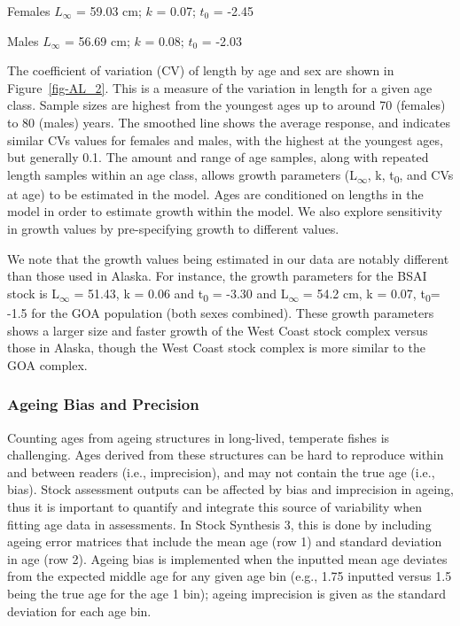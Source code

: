 \documentclass[
]{scrartcl}
\begin{document}
\begin{centering}

Females $L_{\infty}$ = 59.03 cm; $k$ = 0.07; $t_0$ = -2.45

Males $L_{\infty}$ = 56.69 cm; $k$ = 0.08; $t_0$ = -2.03

\end{centering}

The coefficient of variation (CV) of length by age and sex are shown in
Figure~\ref{fig-AL_2}. This is a measure of the variation in length for
a given age class. Sample sizes are highest from the youngest ages up to
around 70 (females) to 80 (males) years. The smoothed line shows the
average response, and indicates similar CVs values for females and
males, with the highest at the youngest ages, but generally 0.1. The
amount and range of age samples, along with repeated length samples
within an age class, allows growth parameters
(L\textsubscript{\(\infty\)}, k, t\textsubscript{0}, and CVs at age) to
be estimated in the model. Ages are conditioned on lengths in the model
in order to estimate growth within the model. We also explore
sensitivity in growth values by pre-specifying growth to different
values.

We note that the growth values being estimated in our data are notably
different than those used in Alaska. For instance, the growth parameters
for the BSAI stock is L\textsubscript{\(\infty\)} = 51.43, k = 0.06 and
t\textsubscript{0} = -3.30 and L\textsubscript{\(\infty\)} = 54.2 cm, k
= 0.07, t\textsubscript{0}= -1.5 for the GOA population (both sexes
combined). These growth parameters shows a larger size and faster growth
of the West Coast stock complex versus those in Alaska, though the West
Coast stock complex is more similar to the GOA complex.

\subsubsection{Ageing Bias and
Precision}\label{ageing-bias-and-precision}

Counting ages from ageing structures in long-lived, temperate fishes is
challenging. Ages derived from these structures can be hard to reproduce
within and between readers (i.e., imprecision), and may not contain the
true age (i.e., bias). Stock assessment outputs can be affected by bias
and imprecision in ageing, thus it is important to quantify and
integrate this source of variability when fitting age data in
assessments. In Stock Synthesis 3, this is done by including ageing
error matrices that include the mean age (row 1) and standard deviation
in age (row 2). Ageing bias is implemented when the inputted mean age
deviates from the expected middle age for any given age bin (e.g., 1.75
inputted versus 1.5 being the true age for the age 1 bin); ageing
imprecision is given as the standard deviation for each age bin.
\end{document}
